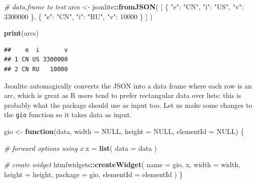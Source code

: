 \documentclass[
]{krantz}
\makeatletter
\newenvironment{Shaded}{\begin{snugshade}}{\end{snugshade}}
\newcommand{\CommentTok}[1]{\textcolor[rgb]{0.37,0.37,0.37}{\textit{#1}}}
\newcommand{\ControlFlowTok}[1]{\textcolor[rgb]{0.27,0.27,0.27}{\textbf{#1}}}
\newcommand{\DataTypeTok}[1]{\textcolor[rgb]{0.27,0.27,0.27}{#1}}
\newcommand{\KeywordTok}[1]{\textcolor[rgb]{0.27,0.27,0.27}{\textbf{#1}}}
\newcommand{\NormalTok}[1]{#1}
\newcommand{\OperatorTok}[1]{\textcolor[rgb]{0.43,0.43,0.43}{\textbf{#1}}}
\newcommand{\OtherTok}[1]{\textcolor[rgb]{0.37,0.37,0.37}{#1}}
\newcommand{\StringTok}[1]{\textcolor[rgb]{0.5,0.5,0.5}{#1}}
\newenvironment{kframe}{%
\medskip{}
\setlength{\fboxsep}{.8em}
 \def\at@end@of@kframe{}%
 \ifinner\ifhmode%
  \def\at@end@of@kframe{\end{minipage}}%
  \begin{minipage}{\columnwidth}%
 \fi\fi%
 \def\FrameCommand##1{\hskip\@totalleftmargin \hskip-\fboxsep
 \colorbox{shadecolor}{##1}\hskip-\fboxsep
     \hskip-\linewidth \hskip-\@totalleftmargin \hskip\columnwidth}%
 \MakeFramed {\advance\hsize-\width
   \@totalleftmargin\z@ \linewidth\hsize
   \@setminipage}}%
 {\par\unskip\endMakeFramed%
 \at@end@of@kframe}
\renewenvironment{Shaded}{\begin{kframe}}{\end{kframe}}
\makeatother
\begin{document}
\begin{Shaded}
\begin{Highlighting}[]
\CommentTok{\# data.frame to test}
\NormalTok{arcs <{-}}\StringTok{ }\NormalTok{jsonlite}\OperatorTok{::}\KeywordTok{fromJSON}\NormalTok{(}
  \StringTok{\textquotesingle{}[}
\StringTok{    \{}
\StringTok{      "e": "CN",}
\StringTok{      "i": "US",}
\StringTok{      "v": 3300000}
\StringTok{    \},}
\StringTok{    \{}
\StringTok{      "e": "CN",}
\StringTok{      "i": "RU",}
\StringTok{      "v": 10000}
\StringTok{    \}}
\StringTok{  ]\textquotesingle{}}
\NormalTok{)}

\KeywordTok{print}\NormalTok{(arcs)}
\end{Highlighting}
\end{Shaded}

\begin{verbatim}
##    e  i       v
## 1 CN US 3300000
## 2 CN RU   10000
\end{verbatim}

Jsonlite automagically converts the JSON into a data frame where each row is an arc, which is great as R users tend to prefer rectangular data over lists: this is probably what the package should use as input too. Let us make some changes to the \texttt{gio} function so it takes data as input.

\begin{Shaded}
\begin{Highlighting}[]
\NormalTok{gio <{-}}\StringTok{ }\ControlFlowTok{function}\NormalTok{(data, }\DataTypeTok{width =} \OtherTok{NULL}\NormalTok{, }\DataTypeTok{height =} \OtherTok{NULL}\NormalTok{, }\DataTypeTok{elementId =} \OtherTok{NULL}\NormalTok{) \{}

  \CommentTok{\# forward options using x}
\NormalTok{  x =}\StringTok{ }\KeywordTok{list}\NormalTok{(}
    \DataTypeTok{data =}\NormalTok{ data}
\NormalTok{  )}

  \CommentTok{\# create widget}
\NormalTok{  htmlwidgets}\OperatorTok{::}\KeywordTok{createWidget}\NormalTok{(}
    \DataTypeTok{name =} \StringTok{\textquotesingle{}gio\textquotesingle{}}\NormalTok{,}
\NormalTok{    x,}
    \DataTypeTok{width =}\NormalTok{ width,}
    \DataTypeTok{height =}\NormalTok{ height,}
    \DataTypeTok{package =} \StringTok{\textquotesingle{}gio\textquotesingle{}}\NormalTok{,}
    \DataTypeTok{elementId =}\NormalTok{ elementId}
\NormalTok{  )}
\NormalTok{\}}
\end{Highlighting}
\end{Shaded}
\end{document}
